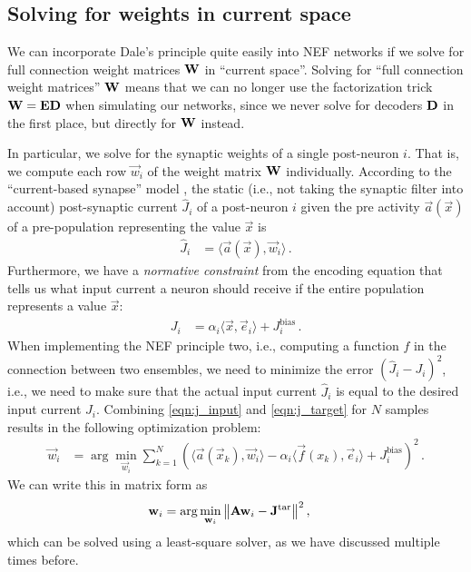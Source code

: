 \documentclass[10pt,letterpaper,oneside]{article}
\begin{document}
\subsection{Solving for weights in current space}

We can incorporate Dale's principle quite easily into NEF networks if we solve for full connection weight matrices ${\mathbf{W}}$ in \enquote{current space}.  Solving for \enquote{full connection weight matrices} ${\mathbf{W}}$ means that we can no longer use the factorization trick ${\mathbf{W}} = {\mathbf{E}} {\mathbf{D}}$ when simulating our networks, since we never solve for decoders ${\mathbf{D}}$ in the first place, but directly for ${\mathbf{W}}$ instead.

In particular, we solve for the synaptic weights of a single post-neuron $i$. That is, we compute each row $\vec w_i$ of the weight matrix ${\mathbf{W}}$ individually. According to the \enquote{current-based synapse} model \cite{roth2009modeling}, the static (i.e., not taking the synaptic filter into account) post-synaptic current $\hat J_i$ of a post-neuron $i$ given the pre activity $\vec a(\vec x)$ of a pre-population representing the value $\vec x$ is
\begin{align}
\hat J_i &= \langle \vec a(\vec x), \vec w_i \rangle \,.
\label{eqn:j_input}
\end{align}
Furthermore, we have a \emph{normative constraint} from the encoding equation that tells us what input current a neuron should receive if the entire population represents a value $\vec x$:
\begin{align}
J_i &= \alpha_i \langle \vec x, \vec e_i \rangle + J^\mathrm{bias}_i \,.
\label{eqn:j_target}
\end{align}
When implementing the NEF principle two, i.e., computing a function $f$ in the connection between two ensembles, we need to minimize the error $(\hat J_i - J_i)^2$, i.e., we need to make sure that the actual input current $\hat J_i$ is equal to the desired input current $J_i$. Combining \cref{eqn:j_input} and \cref{eqn:j_target} for $N$ samples results in the following optimization problem:
\begin{align}
	\vec w_i &= \arg\min_{\vec w_i} \sum_{k = 1}^N \left( \big\langle \vec a(\vec x_k), \vec w_i \big\rangle - \alpha_i \big\langle \vec f(x_k), \vec e_i \big\rangle + J^\mathrm{bias}_i \right)^2 \,.
	\label{eqn:opt_linear}
\end{align}
We can write this in matrix form as
\begin{align*}
	{\mathbf{w}}_i &= \arg\min_{{\mathbf{w}}_i} \big\| {\mathbf{A}} {\mathbf{w}}_i - {\mathbf{J}}^\mathrm{tar} \big\|^2 \,,
\end{align*}
which can be solved using a least-square solver, as we have discussed multiple times before.
\end{document}
